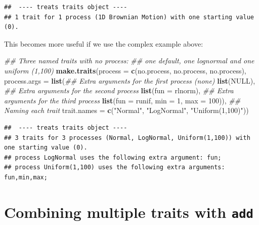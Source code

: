 \documentclass[
]{book}
\newenvironment{Shaded}{\begin{snugshade}}{\end{snugshade}}
\newcommand{\CommentTok}[1]{\textcolor[rgb]{0.56,0.35,0.01}{\textit{#1}}}
\newcommand{\DataTypeTok}[1]{\textcolor[rgb]{0.13,0.29,0.53}{#1}}
\newcommand{\DecValTok}[1]{\textcolor[rgb]{0.00,0.00,0.81}{#1}}
\newcommand{\KeywordTok}[1]{\textcolor[rgb]{0.13,0.29,0.53}{\textbf{#1}}}
\newcommand{\NormalTok}[1]{#1}
\newcommand{\OtherTok}[1]{\textcolor[rgb]{0.56,0.35,0.01}{#1}}
\newcommand{\StringTok}[1]{\textcolor[rgb]{0.31,0.60,0.02}{#1}}
\begin{document}
\begin{verbatim}
##  ---- treats traits object ---- 
## 1 trait for 1 process (1D Brownian Motion) with one starting value (0).
\end{verbatim}

This becomes more useful if we use the complex example above:

\begin{Shaded}
\begin{Highlighting}[]
\CommentTok{\#\# Three named traits with no process:}
\CommentTok{\#\# one default, one lognormal and one uniform (1,100)}
\KeywordTok{make.traits}\NormalTok{(}\DataTypeTok{process      =} \KeywordTok{c}\NormalTok{(no.process, no.process, no.process),}
            \DataTypeTok{process.args =} \KeywordTok{list}\NormalTok{(}\CommentTok{\#\# Extra arguments for the first process (none)}
                                \KeywordTok{list}\NormalTok{(}\OtherTok{NULL}\NormalTok{),}
                                \CommentTok{\#\# Extra arguments for the second process}
                                \KeywordTok{list}\NormalTok{(}\DataTypeTok{fun =}\NormalTok{ rlnorm),}
                                \CommentTok{\#\# Extra arguments for the third process}
                                \KeywordTok{list}\NormalTok{(}\DataTypeTok{fun =}\NormalTok{ runif, }\DataTypeTok{min =} \DecValTok{1}\NormalTok{, }\DataTypeTok{max =} \DecValTok{100}\NormalTok{)),}
            \CommentTok{\#\# Naming each trait}
            \DataTypeTok{trait.names  =} \KeywordTok{c}\NormalTok{(}\StringTok{"Normal"}\NormalTok{, }\StringTok{"LogNormal"}\NormalTok{, }\StringTok{"Uniform(1,100)"}\NormalTok{))}
\end{Highlighting}
\end{Shaded}

\begin{verbatim}
##  ---- treats traits object ---- 
## 3 traits for 3 processes (Normal, LogNormal, Uniform(1,100)) with one starting value (0).
## process LogNormal uses the following extra argument: fun;
## process Uniform(1,100) uses the following extra arguments: fun,min,max;
\end{verbatim}

\hypertarget{combining-multiple-traits-with-add}{%
\section{\texorpdfstring{Combining multiple traits with \texttt{add}}{Combining multiple traits with add}}\label{combining-multiple-traits-with-add}}
\end{document}
